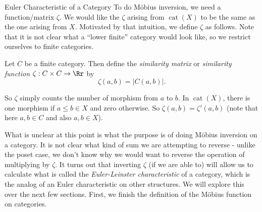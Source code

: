 \documentclass[12pt]{pom_thesis}
\DeclareMathOperator{\cat}{cat}
\begin{document}
\begin{chapter}{Euler Characteristic of a Category}
To do M\"obius inversion, we need a function/matrix $\zeta$. We would like the $\zeta$ arising from $\cat(X)$ to be the same as the one arising from $X$. Motivated by that intuition, we define $\zeta$ as follows. Note that it is not clear what a ``lower finite'' category would look like, so we restrict ourselves to finite categories.

\begin{defn}
Let $C$ be a finite category. Then define the \emph{similarity matrix} or \emph{similarity function} $\zeta : C \times C \rightarrow \Rr$ by 
\[
\zeta(a,b) = |C(a,b)|.
\]
\end{defn}
So $\zeta$ simply counts the number of morphism from $a$ to $b$. In $\cat(X)$, there is one morphism if $a \leq b \in X$ and zero otherwise. So $\zeta(a,b) = \zeta'(a,b)$ (note that here $a,b \in C$ and also $a,b \in X$).

What is unclear at this point is what the purpose is of doing M\"obius inversion on a category. It is not clear what kind of sum we are attempting to reverse - unlike the poset case, we don't know why we would want to reverse the operation of multiplying by $\zeta$. It turns out that inverting $\zeta$ (if we are able to) will allow us to calculate what is called the \emph{Euler-Leinster characteristic} of a category, which is the analog of an Euler characteristic on other structures. We will explore this over the next few sections. First, we finish the definition of the M\"obius function on categories.


\end{chapter}
\end{document}
